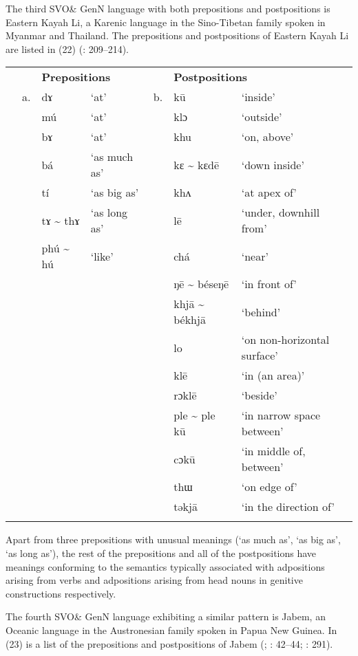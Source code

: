 \documentclass[output=paper]{langsci/langscibook}
\begin{document}
The third SVO\& GenN language with both prepositions and postpositions is Eastern Kayah Li, a Karenic language in the Sino-Tibetan family spoken in Myanmar and Thailand. The prepositions and postpositions of Eastern Kayah Li are listed in (22) (\citealt{Solnit1997}: 209–214).

\begin{table}
\begin{tabularx}{\textwidth}{XXXXXXX} &  & \multicolumn{2}{X}{\bfseries Prepositions} &  & \multicolumn{2}{X}{\bfseries Postpositions}\\
\lsptoprule
& a. & dɤ & ‘at’ & b. & kū & ‘inside’\\
&  & mú & ‘at’ &  & klɔ & ‘outside’\\
&  & bɤ & ‘at’ &  & khu & ‘on, above’\\
&  & bá & ‘as much as’ &  & kɛ {\textasciitilde} kɛdē & ‘down inside’\\
&  & tí & ‘as big as’ &  & khʌ & ‘at apex of’\\
&  & tɤ {\textasciitilde} thɤ & ‘as long as’ &  & lē & ‘under, downhill from’\\
&  & phú {\textasciitilde} hú & ‘like’ &  & chá & ‘near’\\
&  &  &  &  & ŋē {\textasciitilde} béseŋē & ‘in front of’\\
&  &  &  &  & khjā {\textasciitilde} békhjā & ‘behind’\\
&  &  &  &  & lo & ‘on non-horizontal surface’\\
&  &  &  &  & klē & ‘in (an area)’\\
&  &  &  &  & rɔklē & ‘beside’\\
&  &  &  &  & ple {\textasciitilde} ple kū & ‘in narrow space between’\\
&  &  &  &  & cɔkū & ‘in middle of, between’\\
&  &  &  &  & thɯ & ‘on edge of’\\
&  &  &  &  & təkjā & ‘in the direction of’\\
\lspbottomrule
\end{tabularx}
\end{table}


Apart from three prepositions with unusual meanings (‘as much as’, ‘as big as’, ‘as long as’), the rest of the prepositions and all of the postpositions have meanings conforming to the semantics typically associated with adpositions arising from verbs and adpositions arising from head nouns in genitive constructions respectively.

The fourth SVO\& GenN language exhibiting a similar pattern is Jabem, an Oceanic language in the Austronesian family spoken in Papua New Guinea. In (23) is a list of the prepositions and postpositions of Jabem (\citealt{Dempwolff1939}; \citealt{BradshawCzobor2005}: 42–44; \citealt{Ross2002}: 291).
\end{document}
